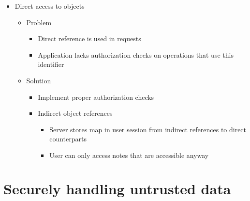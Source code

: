 \documentclass[12pt,titlepage,a4paper]{report}
\begin{document}
\begin{itemize}
				\item Direct access to objects
				\begin{itemize}
					\item Problem
					\begin{itemize}
						\item Direct reference is used in requests
						\item Application lacks authorization checks on operations that use this identifier
					\end{itemize}
					\item Solution
					\begin{itemize}
						\item Implement proper authorization checks
						\item Indirect object references
						\begin{itemize}
							\item Server stores map in user session from indirect references to direct counterparts
							\item User can only access notes that are accessible anyway
						\end{itemize}
					\end{itemize}
				\end{itemize}
			\end{itemize}
		
		\section{Securely handling untrusted data}
\end{document}
